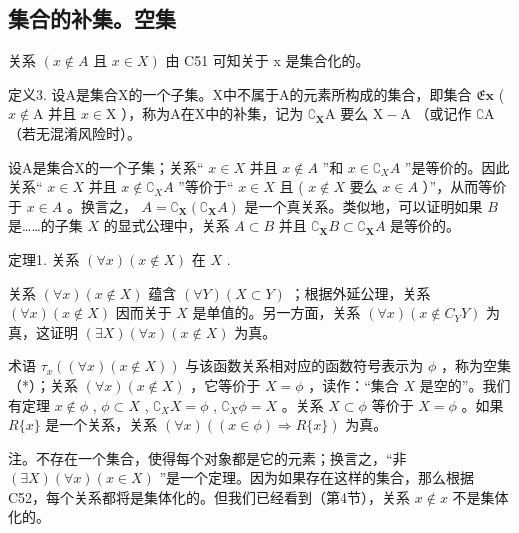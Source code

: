 \subsection{集合的补集。空集}

关系 \((x \notin A \text{ 且 } x \in X)\) 由 C51 可知关于 x 是集合化的。

定义3. 设A是集合X的一个子集。X中不属于A的元素所构成的集合，即集合 \(\mathfrak{E}\mathbf{x}\) ( \(x \notin \mathrm{A}\) 并且 \(x \in \mathrm{X}\) ），称为A在X中的补集，记为 \(\complement_{\mathbf{X}}\mathrm{A}\) 要么 \(\mathrm{X} - \mathrm{A}\) （或记作 \(\complement\mathrm{A}\) （若无混淆风险时）。

设A是集合X的一个子集；关系“ \(x \in X\) 并且 \(x \notin A\) ”和 \(x \in \complement_{X} A\) ”是等价的。因此关系“ \(x \in X\) 并且 \(x \notin \complement_{X} A\) ”等价于“ \(x \in X\) 且 ( \(x \notin X\) 要么 \(x \in A\) ）”，从而等价于 \(x \in A\) 。换言之， \(A = \complement_{\mathbf{X}}(\complement_{\mathbf{X}} A)\) 是一个真关系。类似地，可以证明如果 \(B\) 是……的子集 \(X\) 的显式公理中，关系 \(A \subset B\) 并且 \(\complement_{\mathbf{X}} B \subset \complement_{\mathbf{X}} A\) 是等价的。

定理1. 关系 \((\forall x)(x \notin X)\) 在 \(X\) .

关系 \((\forall x)(x \notin X)\) 蕴含 \((\forall Y)(X \subset Y)\) ；根据外延公理，关系 \((\forall x)(x \notin X)\) 因而关于 \(X\) 是单值的。另一方面，关系 \((\forall x)(x \notin C_{Y}Y)\) 为真，这证明 \((\exists X)(\forall x)(x \notin X)\) 为真。

术语 \(\tau_x((\forall x)(x \notin X))\) 与该函数关系相对应的函数符号表示为 \(\phi\) ，称为空集（*）；关系 \((\forall x)(x \notin X)\) ，它等价于 \(X = \phi\) ，读作：“集合 \(X\) 是空的”。我们有定理 \(x \notin \phi\) , \(\phi \subset X\) , \(\complement_X X = \phi\) , \(\complement_X \phi = X\) 。关系 \(X \subset \phi\) 等价于 \(X = \phi\) 。如果 \(R \{x\}\) 是一个关系，关系 \((\forall x)((x \in \phi) \Longrightarrow R \{x\})\) 为真。

注。不存在一个集合，使得每个对象都是它的元素；换言之，“非 \((\exists X)(\forall x)(x \in X)\) ”是一个定理。因为如果存在这样的集合，那么根据C52，每个关系都将是集体化的。但我们已经看到（第4节），关系 \(x \notin x\) 不是集体化的。

